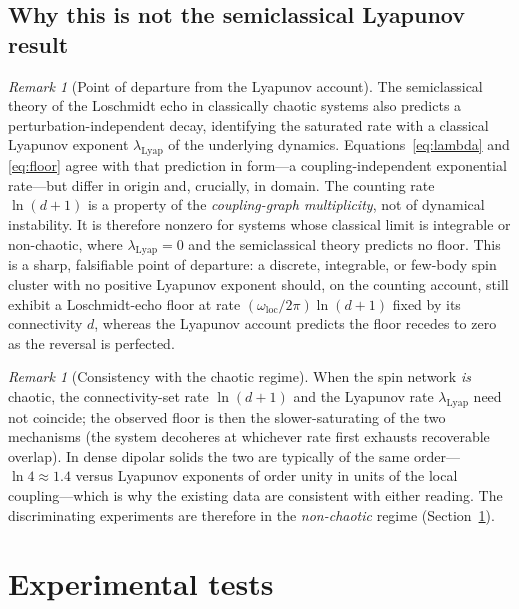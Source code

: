 \documentclass[twocolumn,10pt,a4paper]{article}
\theoremstyle{thmstyle}
\theoremstyle{definition}
\theoremstyle{remark}
\newtheorem{remark}[theorem]{Remark}
\begin{document}
\subsection{Why this is not the semiclassical Lyapunov result}

\begin{remark}[Point of departure from the Lyapunov account]
\label{rem:lyapunov}
The semiclassical theory of the Loschmidt echo in classically chaotic
systems \citep{jalabert2001,gorin2006} also predicts a
perturbation-independent decay, identifying the saturated rate with a
classical Lyapunov exponent $\lambda_{\mathrm{Lyap}}$ of the underlying
dynamics. Equations~\eqref{eq:lambda} and \eqref{eq:floor} agree with that
prediction in form---a coupling-independent exponential rate---but differ
in origin and, crucially, in domain. The counting rate $\ln(d+1)$ is a
property of the \emph{coupling-graph multiplicity}, not of dynamical
instability. It is therefore nonzero for systems whose classical limit is
integrable or non-chaotic, where $\lambda_{\mathrm{Lyap}}=0$ and the
semiclassical theory predicts no floor. This is a sharp, falsifiable point
of departure: a discrete, integrable, or few-body spin cluster with no
positive Lyapunov exponent should, on the counting account, still exhibit a
Loschmidt-echo floor at rate $(\omega_{\mathrm{loc}}/2\pi)\ln(d+1)$ fixed
by its connectivity $d$, whereas the Lyapunov account predicts the floor
recedes to zero as the reversal is perfected.
\end{remark}

\begin{remark}[Consistency with the chaotic regime]
\label{rem:consistency}
When the spin network \emph{is} chaotic, the connectivity-set rate
$\ln(d+1)$ and the Lyapunov rate $\lambda_{\mathrm{Lyap}}$ need not
coincide; the observed floor is then the slower-saturating of the two
mechanisms (the system decoheres at whichever rate first exhausts
recoverable overlap). In dense dipolar solids the two are typically of the
same order---$\ln 4\approx 1.4$ versus Lyapunov exponents of order unity in
units of the local coupling---which is why the existing data
\citep{levstein1998,pastawski2000} are consistent with either reading. The
discriminating experiments are therefore in the \emph{non-chaotic} regime
(Section~\ref{sec:experiments}).
\end{remark}

\section{Experimental tests}
\label{sec:experiments}
\end{document}
